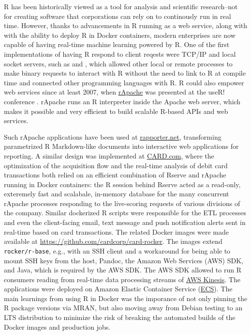 R has been historically viewed as a tool for analysis and scientific
research--not for creating software that corporations can rely on to
continously run in real time. However, thanks to advancements in R
running as a web service, along with with the ability to deploy R in
Docker containers, modern enterprises are now capable of having
real-time machine learning powered by R. One of the first
implementations of having R respond to client reqests were TCP/IP and
local socket servers, such as  and ,
which allowed other local or remote processes to make binary requests to
interact with R without the need to link to R at compile time and
connected other programming languages with R. R could also empower web
services since at least 2007, when
\href{http://www.rapache.net}{rApache} was presented at the useR!
conference \citep{horner_rapache_2013}. rApache runs an R interpreter
inside the Apache web server, which makes it possible and very efficient
to build scalable R-based APIs and web services.

Such rApache applications have been used at
\href{http://rapporter.net}{rapporter.net}, transforming parametrized R
Markdown-like documents into interactive web applications for reporting.
A similar design was implemented at
\href{https://www.card.com/}{CARD.com}, where the optimization of the
acquisition flow and the real-time analysis of debit card transactions
both relied on an efficient combination of Rserve and rApache running in
Docker containers: the R session behind Rserve acted as a read-only,
exteremely fast and scalabale, in-memory database for the many
concurrent rApache processes responding to the live-scoring requests of
various divisions of the company. Similar dockerized R scripts were
responsible for the ETL processes and even the client-facing email, text
message and push notification alerts sent in real-time based on card
transactions. The related Docker images were made available at
\url{https://github.com/cardcorp/card-rocker}. The images extend
\texttt{rocker/r-base}, e.g., with an SSH client and a workaround for
being able to mount SSH keys from the host, Pandoc, the Amazon Web
Services (AWS) SDK, and Java, which is required by the AWS SDK. The AWS
SDK allowed to run R consumers reading from real-time data processing
streams of \href{https://aws.amazon.com/kinesis/}{AWS Kinesis}. The
applications were deployed on Amazon Elastic Container Service
(\href{https://aws.amazon.com/ecs/}{ECS}). The main learnings from using
R in Docker was the imporance of not only pinning the R package versions
via MRAN, but also moving away from Debian testing to an LTS
distribution to minimize the risk of breaking the automated builds of
the Docker images and production jobs.

